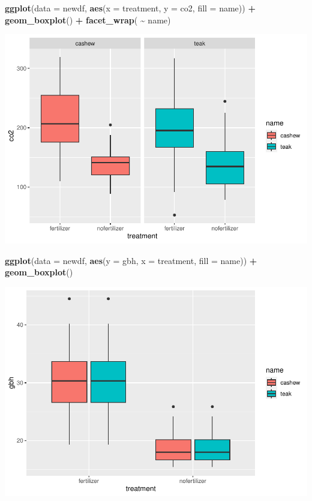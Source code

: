 \documentclass[
]{book}
\newenvironment{Shaded}{\begin{snugshade}}{\end{snugshade}}
\newcommand{\AttributeTok}[1]{\textcolor[rgb]{0.13,0.29,0.53}{#1}}
\newcommand{\FunctionTok}[1]{\textcolor[rgb]{0.13,0.29,0.53}{\textbf{#1}}}
\newcommand{\NormalTok}[1]{#1}
\newcommand{\SpecialCharTok}[1]{\textcolor[rgb]{0.81,0.36,0.00}{\textbf{#1}}}
\begin{document}
\begin{Shaded}
\begin{Highlighting}[]
\FunctionTok{ggplot}\NormalTok{(}\AttributeTok{data =}\NormalTok{ newdf,}
       \FunctionTok{aes}\NormalTok{(}\AttributeTok{x =}\NormalTok{ treatment,}
           \AttributeTok{y =}\NormalTok{ co2,}
           \AttributeTok{fill =}\NormalTok{ name)) }\SpecialCharTok{+}
  \FunctionTok{geom\_boxplot}\NormalTok{() }\SpecialCharTok{+}
  \FunctionTok{facet\_wrap}\NormalTok{( }\SpecialCharTok{\textasciitilde{}}\NormalTok{ name)}
\end{Highlighting}
\end{Shaded}

\includegraphics{_main_files/figure-latex/unnamed-chunk-51-1.pdf}

\begin{Shaded}
\begin{Highlighting}[]
\FunctionTok{ggplot}\NormalTok{(}\AttributeTok{data =}\NormalTok{ newdf,}
       \FunctionTok{aes}\NormalTok{(}\AttributeTok{y =}\NormalTok{ gbh,}
           \AttributeTok{x =}\NormalTok{ treatment,}
           \AttributeTok{fill =}\NormalTok{ name)) }\SpecialCharTok{+}
  \FunctionTok{geom\_boxplot}\NormalTok{()}
\end{Highlighting}
\end{Shaded}

\includegraphics{_main_files/figure-latex/unnamed-chunk-51-2.pdf}
\end{document}
